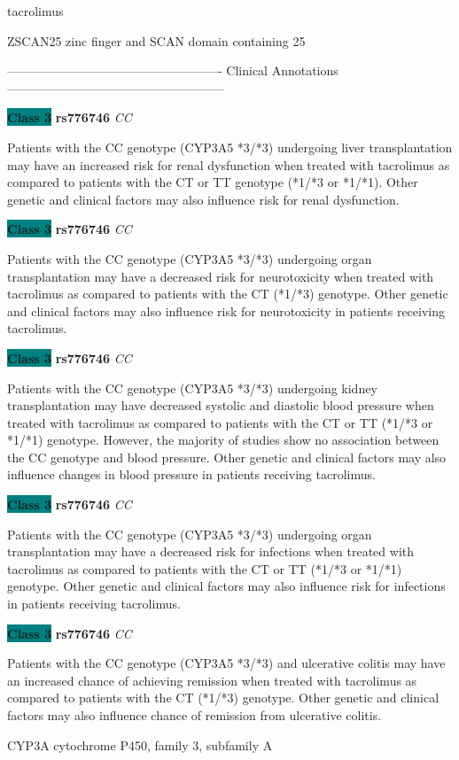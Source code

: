\documentclass{resume} %
\begin{document}
\begin{rSection}{ tacrolimus }
\begin{rSubsection}{ ZSCAN25 }{ zinc finger and SCAN domain containing 25 }{}{}
\item[] ---------------------------------------------------- Clinical Annotations -----------------------------------------------------\newline
\item \textbf{\colorbox{teal} {Class 3}} \textbf{ rs776746 } \textit{ CC }
\item[] Patients with the CC genotype (CYP3A5 *3/*3) undergoing liver transplantation may have an increased risk for renal dysfunction when treated with tacrolimus as compared to patients with the CT or TT genotype (*1/*3 or *1/*1). Other genetic and clinical factors may also influence risk for renal dysfunction. \item \textbf{\colorbox{teal} {Class 3}} \textbf{ rs776746 } \textit{ CC }
\item[] Patients with the CC genotype (CYP3A5 *3/*3) undergoing organ transplantation may have a decreased risk for neurotoxicity when treated with tacrolimus as compared to patients with the CT (*1/*3) genotype. Other genetic and clinical factors may also influence risk for neurotoxicity in patients receiving tacrolimus. \item \textbf{\colorbox{teal} {Class 3}} \textbf{ rs776746 } \textit{ CC }
\item[] Patients with the CC genotype (CYP3A5 *3/*3) undergoing kidney transplantation may have decreased systolic and diastolic blood pressure when treated with tacrolimus as compared to patients with the CT or TT (*1/*3 or *1/*1) genotype. However, the majority of studies show no association between the CC genotype and blood pressure. Other genetic and clinical factors may also influence changes in blood pressure in patients receiving tacrolimus.\item \textbf{\colorbox{teal} {Class 3}} \textbf{ rs776746 } \textit{ CC }
\item[] Patients with the CC genotype (CYP3A5 *3/*3) undergoing organ transplantation may have a decreased risk for infections when treated with tacrolimus as compared to patients with the CT or TT (*1/*3 or *1/*1) genotype. Other genetic and clinical factors may also influence risk for infections in patients receiving tacrolimus.\item \textbf{\colorbox{teal} {Class 3}} \textbf{ rs776746 } \textit{ CC }
\item[] Patients with the CC genotype (CYP3A5 *3/*3) and ulcerative colitis may have an increased chance of achieving remission when treated with tacrolimus as compared to patients with the CT (*1/*3) genotype. Other genetic and clinical factors may also influence chance of remission from ulcerative colitis. 
\end{rSubsection}\begin{rSubsection}{ CYP3A }{ cytochrome P450, family 3, subfamily A }{}{}
\item[]


\end{rSubsection}
\end{rSection}
\end{document}
